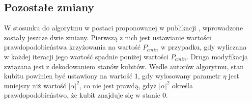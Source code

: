 \subsection{Pozostałe zmiany}
W stosunku do algorytmu w postaci proponowanej w publikacji \cite{NPQGA}, wprowadzone zostały jeszcze dwie zmiany. Pierwszą z nich jest ustawianie wartości prawdopodobieństwa krzyżowania na wartość $P_{c min}$ w przypadku, gdy wyliczana w każdej iteracji jego wartość spadnie poniżej wartości $P_{c min}$. Druga modyfikacja związana jest z dekodowaniem stanów kubitów. Wedle autorów algorytmu, stan kubitu powinien być ustawiony na wartość 1, gdy wylosowany parametr $\eta$ jest mniejszy niż wartość $|\alpha|^2$, co nie jest prawdą, gdyż $|\alpha|^2$ określa prawdopodobieństwo, że kubit znajduje się w stanie 0.